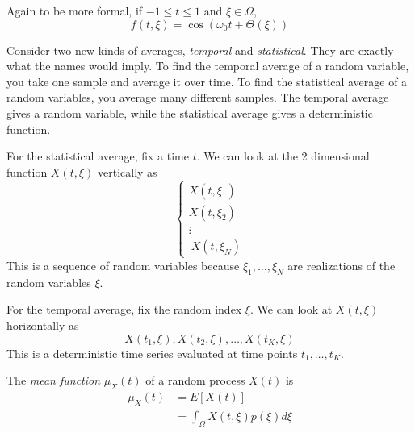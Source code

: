 Again to be more formal, if $-1 \leq t \leq 1$
and $\xi \in \Omega$,
\begin{equation}
    f(t, \xi) = \cos(\omega_0 t + \Theta(\xi))
\end{equation}

Consider two new kinds of averages, \emph{temporal}
and \emph{statistical}. They are exactly what the names
would imply. To find the temporal average of a random
variable, you take one sample and average it over time.
To find the statistical average of a random variables,
you average many different samples. The temporal average
gives a random variable, while the statistical average
gives a deterministic function.

For the statistical average, fix a time $t$. We can
look at the 2 dimensional function $X(t, \xi)$ vertically as
\begin{equation}
    \begin{cases}
        X(t, \xi_1) \\
        X(t, \xi_2) \\
        \vdots      \\\
        X(t, \xi_N)
    \end{cases}
\end{equation}
This is a sequence of random variables because
$\xi_1, \dots, \xi_N$ are realizations of the
random variables $\xi$.

For the temporal average, fix the random index
$\xi$. We can look at $X(t, \xi)$ horizontally as
\begin{equation}
    X(t_1, \xi), X(t_2, \xi), \dots, X(t_K, \xi)
\end{equation}
This is a deterministic time series evaluated at
time points $t_1, \dots, t_K$.

The \emph{mean function} $\mu_X(t)$ of a random process
$X(t)$ is
\begin{align}
    \mu_X(t) & = E[X(t)]                             \\
             & = \int_{\Omega} X(t, \xi) p(\xi) d\xi
\end{align}